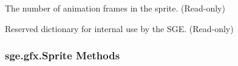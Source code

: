 \documentclass[letterpaper,10pt,english]{sphinxmanual}
\begin{document}
\begin{fulllineitems}
\begin{fulllineitems}
\end{fulllineitems}


\begin{fulllineitems}
\label{gfx:sge.gfx.Sprite.frames}
The number of animation frames in the sprite.  (Read-only)

\end{fulllineitems}


\begin{fulllineitems}
\label{gfx:sge.gfx.Sprite.rd}
Reserved dictionary for internal use by the SGE.  (Read-only)

\end{fulllineitems}


\end{fulllineitems}



\subsubsection{sge.gfx.Sprite Methods}
\label{gfx:sge-gfx-sprite-methods}
\end{document}
